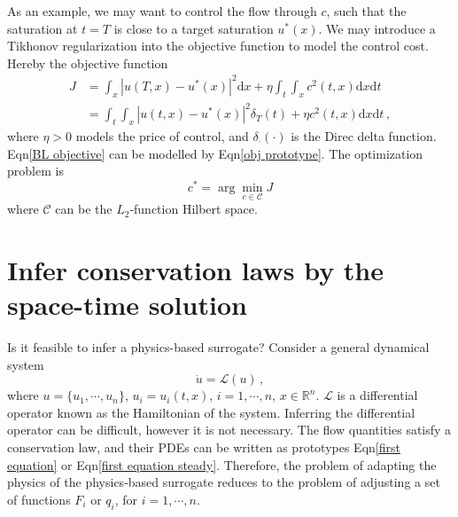 \documentclass[a4paper,onecolumn]{article}
\theoremstyle{remark}
\begin{document}
\noindent As an example, we may
want to control the flow through $c$, such that the saturation at $t=T$ is close to 
a target saturation $u^*(x)$. We may introduce a Tikhonov regularization into the objective function 
to model the control cost.
Hereby the objective function
\begin{equation}\begin{split}
    J &= \int_x \left|u(T,x) - u^*(x)\right|^2 \textrm{d}x + \eta \int_t\int_x  c^2(t,x) \textrm{d}x\textrm{d}t\\
      &= \int_t \int_x \left|u(t,x) - u^*(x)\right|^2 \delta_T(t) + \eta c^2(t,x) \textrm{d}x \textrm{d}t \,,
\end{split} \label{BL objective}
\end{equation}
where $\eta>0$ models the price of control, and $\delta_\cdot(\cdot)$ is the Direc delta function.
Eqn\eqref{BL objective} can be modelled by Eqn\eqref{obj prototype}.
The optimization problem is
\begin{equation}
    c^* = \arg\min_{c\in \mathcal{C}} J
\end{equation}
where $\mathcal{C}$ can be the $L_2$-function Hilbert space.\\

\section{Infer conservation laws by the space-time solution}
\label{infer}
\noindent Is it feasible to infer a
physics-based surrogate? Consider a general dynamical system
\begin{equation}
    \dot{u} = \mathcal{L}(u)\,,
    \label{general equation}
\end{equation}
where $u=\{u_1,\cdots, u_n\}$, $u_i = u_i(t,x)$, $i=1,\cdots,n$, $x\in \mathbb{R}^n$.
$\mathcal{L}$ is a differential operator known as the Hamiltonian of the system.
Inferring the differential operator can be difficult, however it is not necessary.
The flow quantities satisfy a conservation law, and their PDEs 
can be written as prototypes Eqn\eqref{first equation}
or Eqn\eqref{first equation steady}.
Therefore, the problem of adapting the physics of the physics-based surrogate reduces to the
problem of adjusting a set of functions $F_i$ or
$q_i$, for $i=1,\cdots,n$. \\
\end{document}

